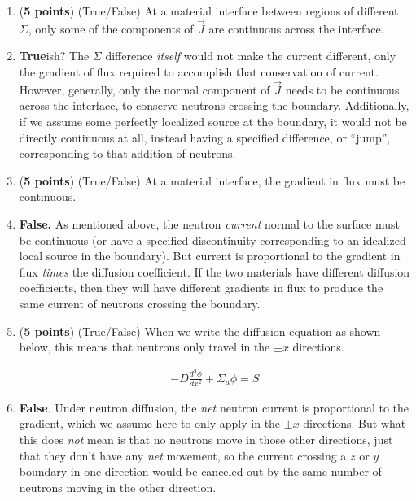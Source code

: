 \documentclass[11pt]{article}
\newcommand{\beq}{\begin{equation}\begin{aligned}}
\newcommand{\eeq}{\end{aligned}\end{equation}}
\newcommand{\ans}[1]{{\color{violet}#1}}
\begin{document}
\begin{enumerate}
\item[(a)] ({\bf 5 points}) (True/False) At a material interface between regions of different $\Sigma$, only some of the components of $\vec{J}$ are continuous across the interface.
\item[] \ans{\textbf{True}ish? The $\Sigma$ difference \emph{itself} would not make the current different, only the gradient of flux required to accomplish that conservation of current.
However, generally, only the normal component of $\vec{J}$ needs to be continuous across the interface, to conserve neutrons crossing the boundary.
Additionally, if we assume some perfectly localized source at the boundary, it would not be directly continuous at all, instead having a specified difference, or ``jump'', corresponding to that addition of neutrons.}
\item[(b)] ({\bf 5 points}) (True/False) At a material interface, the gradient in flux must be continuous.
\item[] \ans{
    \textbf{False.} As mentioned above, the neutron \emph{current} normal to the surface must be continuous (or have a specified discontinuity corresponding to an idealized local source in the boundary).
    But current is proportional to the gradient in flux \emph{times} the diffusion coefficient.
    If the two materials have different diffusion coefficients, then they will have different gradients in flux to produce the same current of neutrons crossing the boundary.
}
\item[(c)] ({\bf 5 points}) (True/False) When we write the diffusion equation as shown below, this means that neutrons only travel in the $\pm x$ directions.

\beq
-D\frac{d^2\phi}{dx^2}+\Sigma_a\phi=S
\eeq
\item[] \ans{
    \textbf{False}.
    Under neutron diffusion, the \emph{net} neutron current is proportional to the gradient, which we assume here to only apply in the $\pm x$ directions.
    But what this does \emph{not} mean is that no neutrons move in those other directions, just that they don't have any \emph{net} movement, so the current crossing a $z$ or $y$ boundary in one direction would be canceled out by the same number of neutrons moving in the other direction.
}
\end{enumerate}


\appendix
\end{document}
